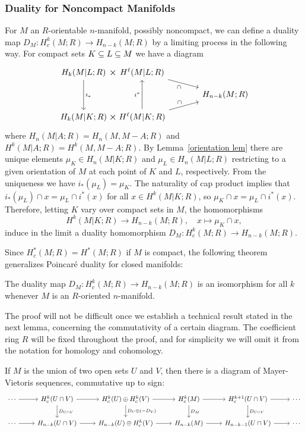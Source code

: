 \subsubsection{Duality for Noncompact Manifolds}
For $M$ an $R$-orientable $n$-manifold, possibly noncompact, we can define a duality map $D_M:H^k_c(M;R)\to H_{n-k}(M;R)$ by a limiting process in the following way. For compact sets $K\subseteq L\subseteq M$ we have a diagram
\[\begin{tikzcd}[column sep=tiny,row sep=small]
H_k(M|L;R)\ar[draw=none]{r}[name=X, anchor=center,scale=1.5]{\times}\ar[dd,"i_*"]&H^\ell(M|L;R)\ar[rrrrrrd,swap,"\cap"]&&&&&&\\
&&&&&&&H_{n-k}(M;R)\\
H_k(M|K;R)\ar[draw=none]{r}[name=Y, anchor=center,scale=1.5]{\times}&H^\ell(M|K;R)\ar[uu,"i^*"]\ar[rrrrrru,"\cap"]&&&&&&
\end{tikzcd}\]
where $H_n(M|A;R)=H_n(M,M-A;R)$ and $H^k(M|A;R)=H^k(M,M-A;R)$. By Lemma~\ref{orientation lem} there are unique elements $\mu_K\in H_n(M|K;R)$ and $\mu_L\in H_n(M|L;R)$ restricting to a given orientation of $M$ at each point of $K$ and $L$, respectively. From the uniqueness we have $i_*(\mu_L)=\mu_K$. The naturality of cap product implies that $i_*(\mu_L)\cap x=\mu_L\cap i^*(x)$ for all $x\in H^k(M|K;R)$, so $\mu_K\cap x=\mu_L\cap i^*(x)$. Therefore, letting $K$ vary over compact sets in $M$, the homomorphisms 
\[H^k(M|K;R)\to H_{n-k}(M;R),\quad x\mapsto\mu_K\cap x,\] 
induce in the limit a duality homomorphism $D_M:H^k_c(M;R)\to H_{n-k}(M;R)$.\par
Since $H^*_c(M;R)=H^*(M;R)$ if $M$ is compact, the following theorem generalizes Poincar\'e duality for closed manifolds:
\begin{theorem}\label{Poincare duality}
The duality map $D_M:H^k_c(M;R)\to H_{n-k}(M;R)$ is an isomorphism for all $k$ whenever $M$ is an $R$-oriented $n$-manifold.
\end{theorem}
The proof will not be difficult once we establish a technical result stated in the next lemma, concerning the commutativity of a certain diagram. The coefficient ring $R$ will be fixed throughout the proof, and for simplicity we
will omit it from the notation for homology and cohomology.
\begin{lemma}
If $M$ is the union of two open sets $U$ and $V$, then there is a diagram of Mayer-Vietoris sequences, commutative up to sign:
\[\begin{tikzcd}
\cdots\ar[r]&H^k_c(U\cap V)\ar[r]\ar[d,"D_{U\cap V}"]&H^k_c(U)\oplus H^k_c(V)\ar[r]\ar[d,"D_{U}\oplus(-D_V)"]&H^k_c(M)\ar[r]\ar[d,"D_{M}"]&H^{k+1}_c(U\cap V)\ar[r]\ar[d,"D_{U\cap V}"]&\cdots\\
\cdots\ar[r]&H_{n-k}(U\cap V)\ar[r]&H_{n-k}(U)\oplus H^k_c(V)\ar[r]&H_{n-k}(M)\ar[r]&H_{n-k-1}(U\cap V)\ar[r]&\cdots
\end{tikzcd}\]
\end{lemma}
